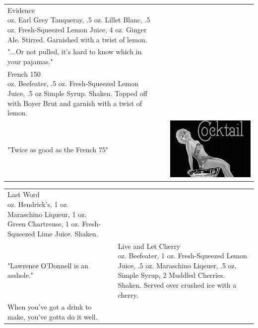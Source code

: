 \documentclass{article}
\makeatletter
\newcommand \Dotfill {\leavevmode \cleaders \hb@xt@ .25em{\hss .\hss }\hfill \kern \z@}%
\makeatother
\begin{document}
{

\begin{tabular}{b{}m{}b{}}
{\centering\Huge{Evidence}\\*}
\centering 2 oz. Earl Grey Tanqueray, .5 oz. Lillet Blanc, .5 oz. Fresh-Squeezed Lemon Juice, 4 oz. Ginger Ale. Stirred. Garnished with a twist of lemon.\\
\centering\small{"...Or not pulled, it's hard to know which in your pajamas."}\\[-.3in]
\makebox[.8\columnwidth]{\Huge\Dotfill}
{\centering\Huge{French 150}\\*}
\centering 1 oz. Beefeater, .5 oz. Fresh-Squeezed Lemon Juice, .5 oz Simple Syrup. Shaken. Topped off with Boyer Brut and garnish with a twist of lemon. \\
\centering\small{"Twice as good as the French 75"}
&
&
\includegraphics[scale=.85]{cocktail.png}
\end{tabular}
\makebox[\columnwidth]{\Huge\Dotfill}


\begin{tabular}{m{}m{}m{}}
{\centering\Huge{Last Word}\\*}
\centering 1 oz. Hendrick's, 1 oz. Maraschino Liqueur, 1 oz. Green Chartreuse, 1 oz. Fresh-Squeezed Lime Juice. Shaken.\\
\centering\small{"Lawrence O'Donnell is an asshole."}
&
&
{\centering\Huge{Live and Let Cherry}\\*}
\centering 2 oz. Beefeater, 1 oz. Fresh-Squeezed Lemon Juice, .5 oz. Maraschino Liqeuer, .5 oz. Simple Syrup, 2 Muddled Cherries. Shaken. Served over crushed ice with a cherry.\\
\centering\small{When you've got a drink to make, you've gotta do it well.}
\end{tabular}
\makebox[\columnwidth]{\Huge\Dotfill}\\[-4pt]

}
\end{document}
